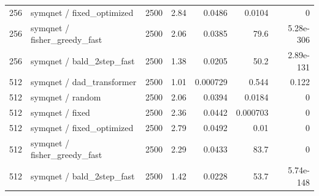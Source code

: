 \begin{tabular}{llrrrrr}
256 & symqnet / fixed\_optimized & 2500 & 2.84 & 0.0486 & 0.0104 & 0 \\
256 & symqnet / fisher\_greedy\_fast & 2500 & 2.06 & 0.0385 & 79.6 & 5.28e-306 \\
256 & symqnet / bald\_2step\_fast & 2500 & 1.38 & 0.0205 & 50.2 & 2.89e-131 \\
512 & symqnet / dad\_transformer & 2500 & 1.01 & 0.000729 & 0.544 & 0.122 \\
512 & symqnet / random & 2500 & 2.06 & 0.0394 & 0.0184 & 0 \\
512 & symqnet / fixed & 2500 & 2.36 & 0.0442 & 0.000703 & 0 \\
512 & symqnet / fixed\_optimized & 2500 & 2.79 & 0.0492 & 0.01 & 0 \\
512 & symqnet / fisher\_greedy\_fast & 2500 & 2.29 & 0.0433 & 83.7 & 0 \\
512 & symqnet / bald\_2step\_fast & 2500 & 1.42 & 0.0228 & 53.7 & 5.74e-148 \\
\bottomrule
\end{tabular}

